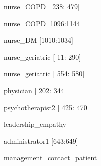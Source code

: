 \documentclass[12pt,a4paper,oneside]{article}
\begin{document}
\begin{itemize}
{ \item nurse\_COPD [ 238: 479] }%
{ \item nurse\_COPD [1096:1144] }%
{ \item nurse\_DM [1010:1034] }%
{ \item nurse\_geriatric [  11: 290] }%
{ \item nurse\_geriatric [ 554: 580] }%
{ \item physician [ 202: 344] }%
{ \item psychotherapist2 [ 425: 470] }%
\end{itemize}
{leadership\_empathy}
\begin{itemize}
{ \item administrator1 [643:649] }%
\end{itemize}
{management\_contact\_patient}
\end{document}

